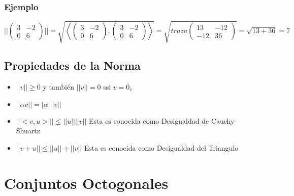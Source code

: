\documentclass[12pt]{report}							    %
\begin{document}
        \subsubsection{Ejemplo}

        \begin{equation*}
            ||\begin{pmatrix} 3 & -2 \\ 0 & 6 \end{pmatrix}|| = \sqrt{ \left<  \begin{pmatrix} 3 & -2 \\ 0 & 6 \end{pmatrix}, \begin{pmatrix} 3 & -2 \\ 0 & 6 \end{pmatrix} \right>} =  \sqrt{ traza  \begin{pmatrix} 13 & -12 \\ -12 & 36 \end{pmatrix} } = \sqrt{13+36} = 7  
        \end{equation*}


        \subsection{Propiedades de la Norma}
        \begin{itemize}
            \item $||v|| \geq 0$ y también $||v|| = 0$ ssi $v = 0_v$   
            \item $|| \alpha v||  = |\alpha| ||v|| $
            \item $||<v, u>||  \leq ||u|| ||v|| $ Esta es conocida como Desigualdad de Cauchy-Shuartz
            \item $||v + u||  \leq ||u|| + ||v|| $ Esta es conocida como Desigualdad del Triangulo
        \end{itemize}



    \clearpage
    \section{Conjuntos Octogonales}
\end{document}
